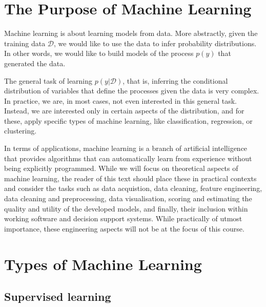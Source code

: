 \begin{refsection}
\section{The Purpose of Machine Learning}


Machine learning is about learning models from data. More abstractly, given the training data $\mathcal{D}$, we would like to use the data to infer probability distributions. In other words, we would like to build models of the process $p(y)$ that generated the data.

The general task of learning $p(y|\mathcal{D})$, that is, inferring the conditional distribution of variables that define the processes given the data is very complex. In practice, we are, in most cases, not even interested in this general task. Instead, we are interested only in certain aspects of the distribution, and for these, apply specific types of machine learning, like classification, regression, or clustering.

In terms of applications, machine learning is a branch of artificial intelligence that provides algorithms that can automatically learn from experience without being explicitly programmed. While we will focus on theoretical aspects of machine learning, the reader of this text should place these in practical contexts and consider the tasks such as data acquistion, data cleaning, feature engineering, data cleaning and preprocessing, data visualisation, scoring and estimating the quality and utility of the developed models, and finally, their inclusion within working software and decision support systems. While practically of utmost importance, these engineering aspects will not be at the focus of this course.

\section{Types of Machine Learning}

\subsection*{Supervised learning}


\end{refsection}
